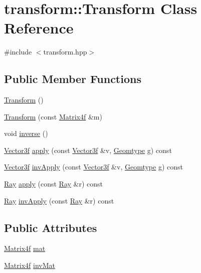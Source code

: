 \hypertarget{classtransform_1_1Transform}{}\section{transform\+::Transform Class Reference}
\label{classtransform_1_1Transform}


{\ttfamily \#include $<$transform.\+hpp$>$}

\subsection*{Public Member Functions}
\begin{DoxyCompactItemize}
\item 
\mbox{\hyperlink{classtransform_1_1Transform_a685ac413ffdce1002c179cf712514b39}{Transform}} ()
\item 
\mbox{\hyperlink{classtransform_1_1Transform_aa6fd45e6d1592b529ffdbd91b9297e16}{Transform}} (const \mbox{\hyperlink{cyclop_8hpp_a65205693559e288093427c05b128827f}{Matrix4f}} \&m)
\item 
void \mbox{\hyperlink{classtransform_1_1Transform_a9695a83b5edd62ff6ecc17935347a2e6}{inverse}} ()
\item 
\mbox{\hyperlink{cyclop_8hpp_a5a0a2e85b081623ef3f7e7e8d43024f5}{Vector3f}} \mbox{\hyperlink{classtransform_1_1Transform_a4582c73440c1403fafdf8b893303b796}{apply}} (const \mbox{\hyperlink{cyclop_8hpp_a5a0a2e85b081623ef3f7e7e8d43024f5}{Vector3f}} \&v, \mbox{\hyperlink{cyclop_8hpp_a2317999143a1598860004551163419b5}{Geomtype}} g) const
\item 
\mbox{\hyperlink{cyclop_8hpp_a5a0a2e85b081623ef3f7e7e8d43024f5}{Vector3f}} \mbox{\hyperlink{classtransform_1_1Transform_acd9d4c88abc5fedf91e3ef78150fee87}{inv\+Apply}} (const \mbox{\hyperlink{cyclop_8hpp_a5a0a2e85b081623ef3f7e7e8d43024f5}{Vector3f}} \&v, \mbox{\hyperlink{cyclop_8hpp_a2317999143a1598860004551163419b5}{Geomtype}} g) const
\item 
\mbox{\hyperlink{classRay}{Ray}} \mbox{\hyperlink{classtransform_1_1Transform_a287e03fb3af3a5b8cdb8ecf060bae307}{apply}} (const \mbox{\hyperlink{classRay}{Ray}} \&r) const
\item 
\mbox{\hyperlink{classRay}{Ray}} \mbox{\hyperlink{classtransform_1_1Transform_ad08a5d433b7ffd1200e20e47245bb11b}{inv\+Apply}} (const \mbox{\hyperlink{classRay}{Ray}} \&r) const
\end{DoxyCompactItemize}
\subsection*{Public Attributes}
\begin{DoxyCompactItemize}
\item 
\mbox{\hyperlink{cyclop_8hpp_a65205693559e288093427c05b128827f}{Matrix4f}} \mbox{\hyperlink{classtransform_1_1Transform_ad214be4833e197c9e91465c4a6a977ec}{mat}}
\item 
\mbox{\hyperlink{cyclop_8hpp_a65205693559e288093427c05b128827f}{Matrix4f}} \mbox{\hyperlink{classtransform_1_1Transform_a243a6a85d6447bbac378eb44deb53fff}{inv\+Mat}}
\end{DoxyCompactItemize}


